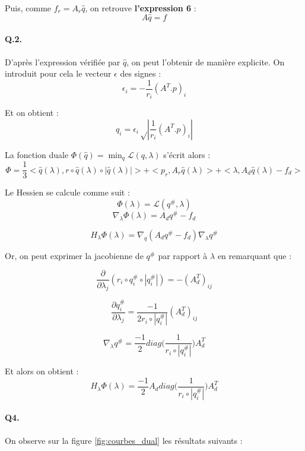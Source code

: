 \documentclass{article}
\begin{document}
        Puis, comme $f_r = A_r \hat{q}$, on retrouve \textbf{l'expression 6} :
        \[ A \hat{q} = f \]

        \paragraph{Q.2.} D'après l'expression vérifiée par $\hat{q}$, on peut l'obtenir de manière explicite.
        On introduit pour cela le vecteur $\epsilon$ des signes :
        \[\epsilon_i = -\frac{1}{r_i}(A^T.p)_i\]

        Et on obtient : 
        \[ \boxed{q_i = \epsilon_i \sqrt\left| \frac{1}{r_i}\left(A^T.p\right)_i\right|}\]

        La fonction duale $\Phi(\hat{q}) = \min_q \mathcal{L}(q, \lambda)$ s'écrit alors :
        \[\boxed{\Phi = \frac{1}{3}<\hat{q}(\lambda), r \circ \hat{q}(\lambda) \circ |\hat{q}(\lambda)|> + <p_r, A_r\hat{q}(\lambda)>
        + <\lambda, A_d\hat{q}(\lambda) - f_d>}\]
        
        Le Hessien se calcule comme suit :
        $$ \Phi (\lambda) = \mathcal{L} (q^{\#}, \lambda) $$
        $$ \nabla_{\lambda} \Phi (\lambda) = A_d q^{\#} - f_d $$

        $$ H_{\lambda} \Phi (\lambda) = \nabla_q (A_d q^{\#} - f_d) \nabla_{\lambda} q^{\#} $$

        Or, on peut exprimer la jacobienne de $q^{\#}$ par rapport à $\lambda$ en remarquant que :

        $$ \frac{\partial}{\partial \lambda_j} (r_i\circ q_i^{\#}\circ |q_i^{\#}|) = - (A_d^T)_{ij} $$
        
        $$ \frac{\partial q_i^{\#}}{\partial \lambda_j} = \frac{-1}{2r_i\circ |q_i^{\#}|} (A_d^T)_{ij} $$

        $$ \nabla_{\lambda} q^{\#} = \frac{-1}{2} diag\big(\frac{1}{r_i\circ |q_i^{\#}|}\big) A_d^T $$


        Et alors on obtient :
        $$\boxed{H_{\lambda} \Phi (\lambda) = \frac{-1}{2} A_d diag\big(\frac{1}{r_i\circ|q_i^{\#}|}\big) A_d^T} $$

        \paragraph{Q4.} On observe sur la figure \ref{fig:courbes_dual} les résultats suivants :
        \begin{itemize}


        \end{itemize}
\end{document}

